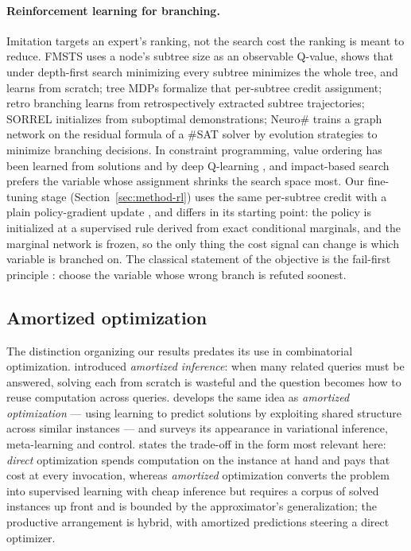 \documentclass[preprint,12pt]{elsarticle}
\begin{document}
\paragraph{Reinforcement learning for branching.} Imitation targets an expert's ranking, not the search cost the ranking is meant to reduce. FMSTS \citep{etheve2020reinforcement} uses a node's subtree size as an observable Q-value, shows that under depth-first search minimizing every subtree minimizes the whole tree, and learns from scratch; tree MDPs \citep{scavuzzo2022learning} formalize that per-subtree credit assignment; retro branching \citep{parsonson2023reinforcement} learns from retrospectively extracted subtree trajectories; SORREL \citep{sorrel2025} initializes from suboptimal demonstrations; Neuro\# \citep{vaezipoor2021learning} trains a graph network on the residual formula of a \#SAT solver by evolution strategies to minimize branching decisions. In constraint programming, value ordering has been learned from solutions \citep{chu2015learning} and by deep Q-learning \citep{cappart2021combining}, and impact-based search \citep{refalo2004impact} prefers the variable whose assignment shrinks the search space most. Our fine-tuning stage (Section~\ref{sec:method-rl}) uses the same per-subtree credit with a plain policy-gradient update \citep{williams1992simple}, and differs in its starting point: the policy is initialized at a supervised rule derived from exact conditional marginals, and the marginal network is frozen, so the only thing the cost signal can change is which variable is branched on. The classical statement of the objective is the fail-first principle \citep{haralick1980increasing}: choose the variable whose wrong branch is refuted soonest.

\subsection{Amortized optimization}

The distinction organizing our results predates its use in combinatorial optimization. \citet{gershman2014amortized} introduced \emph{amortized inference}: when many related queries must be answered, solving each from scratch is wasteful and the question becomes how to reuse computation across queries. \citet{amos2023tutorial} develops the same idea as \emph{amortized optimization} --- using learning to predict solutions by exploiting shared structure across similar instances --- and surveys its appearance in variational inference, meta-learning and control. \citet{millidge2022deconfusing} states the trade-off in the form most relevant here: \emph{direct} optimization spends computation on the instance at hand and pays that cost at every invocation, whereas \emph{amortized} optimization converts the problem into supervised learning with cheap inference but requires a corpus of solved instances up front and is bounded by the approximator's generalization; the productive arrangement is hybrid, with amortized predictions steering a direct optimizer.
\end{document}
